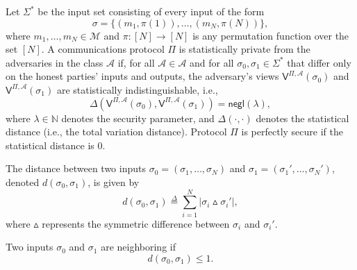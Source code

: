 \begin{definition}  \label{def:statistical-privacy}
    Let $\Sigma^*$ be the input set consisting of every input of the form
    $$
    \sigma = \{(m_1, \pi(1)), \dots, (m_N, \pi(N))\},
    $$
    where $m_1, \dots, m_N \in \mathcal{M}$ and $\pi : [N] \rightarrow [N]$ is any permutation function over the set $[N]$. A communications protocol $\Pi$ is statistically private from the adversaries in the class $\mathcal{A}$ if, for all $\mathcal{A} \in \mathcal{A}$ and for all $\sigma_0, \sigma_1 \in \Sigma^*$ that differ only on the honest parties' inputs and outputs, the adversary's views $\mathsf{V}^{\Pi,\mathcal{A}}(\sigma_0)$ and $\mathsf{V}^{\Pi,\mathcal{A}}(\sigma_1)$ are statistically indistinguishable, i.e.,
    $$
    \Delta(\mathsf{V}^{\Pi,\mathcal{A}}(\sigma_0), \mathsf{V}^{\Pi,\mathcal{A}}(\sigma_1)) = \mathsf{negl}(\lambda),
    $$
    where $\lambda \in \mathbb{N}$ denotes the security parameter, and $\Delta(\cdot, \cdot)$ denotes the statistical distance (i.e., the total variation distance). Protocol $\Pi$ is perfectly secure if the statistical distance is 0.
    \\
\end{definition}

\begin{definition}  \label{def:distance-between-inputs} 
    The distance between two inputs $\sigma_0 = (\sigma_1, \dots, \sigma_N)$ and $\sigma_1 = (\sigma_1', \dots, \sigma_N')$, denoted $d(\sigma_0, \sigma_1)$, is given by
    $$
    d(\sigma_0, \sigma_1) \overset{\Delta}{=} \sum_{i=1}^{N} |\sigma_{i} \vartriangle \sigma_{i}'|,
    $$
    where $\vartriangle$ represents the symmetric difference between $\sigma_{i}$ and $\sigma_{i}'$.\\
\end{definition}

\begin{definition}  \label{def:neighboring-inputs} 
    Two inputs $\sigma_0$ and $\sigma_1$ are neighboring if 
    $$
    d(\sigma_0, \sigma_1) \leq 1.
    $$\\
\end{definition}

